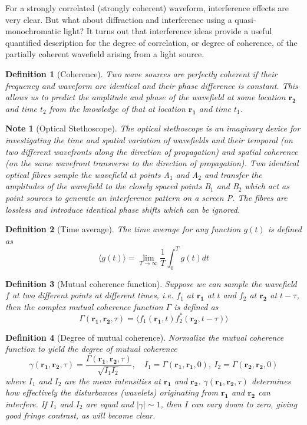 \documentclass[a4paper]{article}
\newtheorem{Note}{Note}[section]
\theoremstyle{new}
\newtheorem{defi}{Definition}[section]
\begin{document}
For a strongly correlated (strongly coherent) waveform, interference effects are very clear. But what about diffraction and interference using a quasi-monochromatic light? It turns out that interference ideas provide a useful quantified description for the degree of correlation, or degree of coherence, of the partially coherent wavefield arising from a light source.
\begin{defi}[Coherence]
Two wave sources are perfectly coherent if their frequency and waveform are identical and their phase difference is constant. This allows us to predict the amplitude and phase of the wavefield at some location $\mathbf{r_2}$ and time $t_2$ from the knowledge of that at location $\mathbf{r_1}$ and time $t_1$.
\end{defi}
\begin{Note}[Optical Stethoscope]
The optical stethoscope is an imaginary device for investigating the time and spatial variation of wavefields and their temporal (on two different wavefronts along the direction of propagation) and spatial coherence (on the same wavefront transverse to the direction of propagation). Two identical optical fibres sample the wavefield at points A$_1$ and A$_2$ and transfer the amplitudes of the wavefield to the closely spaced points B$_1$ and B$_2$ which act as point sources to generate an interference pattern on a screen P. The fibres are lossless and introduce identical phase shifts which can be ignored.
\end{Note}
\begin{defi}[Time average]
The time average for any function $g(t)$ is defined as
$$\langle g(t)\rangle=\lim_{T\rightarrow\infty}\frac{1}{T}\int_0^Tg(t)dt$$
\end{defi}
\begin{defi}[Mutual coherence function]
Suppose we can sample the wavefield $f$ at two different points at different times, i.e. $f_1$ at $\mathbf{r_1}$ at $t$ and $f_2$ at $\mathbf{r_2}$ at $t-\tau$, then the complex mutual coherence function $\Gamma$ is defined as
$$\Gamma(\mathbf{r_1},\mathbf{r_2},\tau)=\langle f_1(\mathbf{r_1},t)f_2^*(\mathbf{r_2},t-\tau)\rangle$$
\end{defi}
\begin{defi}[Degree of mutual coherence]
Normalize the mutual coherence function to yield the degree of mutual coherence
$$\gamma(\mathbf{r_1},\mathbf{r_2},\tau)=\frac{\Gamma(\mathbf{r_1},\mathbf{r_2},\tau)}{\sqrt{I_1I_2}},\quad I_1=\Gamma(\mathbf{r_1},\mathbf{r_1},0),~I_2=\Gamma(\mathbf{r_2},\mathbf{r_2},0)$$
where $I_1$ and $I_2$ are the mean intensities at $\mathbf{r_1}$ and $\mathbf{r_2}$. $\gamma(\mathbf{r_1}, \mathbf{r_2}, \tau)$ determines how effectively the disturbances (wavelets) originating from $\mathbf{r_1}$ and $\mathbf{r_2}$ can interfere. If $I_1$ and $I_2$ are equal and $|\gamma|\sim1$, then $I$ can vary down to zero, giving good fringe contrast, as will become clear.
\end{defi}
\end{document}

